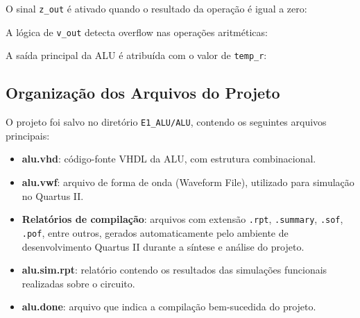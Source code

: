 O sinal \texttt{z\_out} é ativado quando o resultado da operação é igual a zero:

\begin{figure}[H]
\centering

\end{figure}

A lógica de \texttt{v\_out} detecta overflow nas operações aritméticas:

\begin{figure}[H]
\centering

\end{figure}

A saída principal da ALU é atribuída com o valor de \texttt{temp\_r}:

\begin{figure}[H]
\centering

\end{figure}

\subsection{Organização dos Arquivos do Projeto}

O projeto foi salvo no diretório \texttt{E1\_ALU/ALU}, contendo os seguintes arquivos principais:

\begin{itemize}
  \item \textbf{alu.vhd}: código-fonte VHDL da ALU, com estrutura combinacional.
  
  \item \textbf{alu.vwf}: arquivo de forma de onda (Waveform File), utilizado para simulação no Quartus II.
  
  \item \textbf{Relatórios de compilação}: arquivos com extensão \texttt{.rpt}, \texttt{.summary}, \texttt{.sof}, \texttt{.pof}, entre outros, gerados automaticamente pelo ambiente de desenvolvimento Quartus II durante a síntese e análise do projeto.
  
  \item \textbf{alu.sim.rpt}: relatório contendo os resultados das simulações funcionais realizadas sobre o circuito.
  
  \item \textbf{alu.done}: arquivo que indica a compilação bem-sucedida do projeto.
\end{itemize}


    
